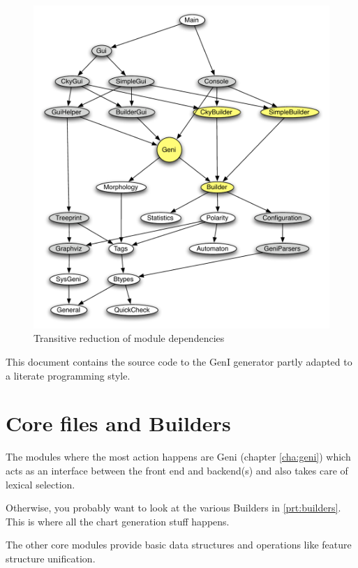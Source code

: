 \documentclass[a4paper,11pt]{report}
\begin{document}
\begin{figure}[h]
\begin{center}
\includegraphics[scale=0.5]{images/genidep}
\caption{Transitive reduction of module dependencies}
\end{center}
\end{figure}

This document contains the source code to the GenI generator 
partly adapted to a literate programming style.  

\section{Core files and Builders}

The modules where the most action happens are Geni (chapter
\ref{cha:geni}) which acts as an interface between the front end and
backend(s) and also takes care of lexical selection.

Otherwise, you probably want to look at the various Builders in
\ref{prt:builders}.  This is where all the chart generation stuff
happens.

The other core modules provide basic data structures and operations
like feature structure unification.
\end{document}
